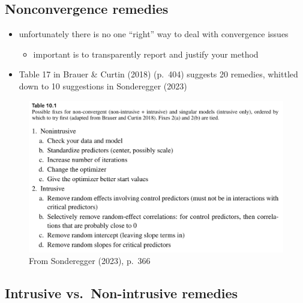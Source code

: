 \documentclass[
  letterpaper,
  DIV=11,
  numbers=noendperiod]{scrartcl}
\providecommand{\tightlist}{%
  \setlength{\itemsep}{0pt}\setlength{\parskip}{0pt}}\usepackage{longtable,booktabs,array}
\begin{document}
\hypertarget{nonconvergence-remedies}{%
\subsection{Nonconvergence remedies}\label{nonconvergence-remedies}}

\begin{itemize}
\tightlist
\item
  unfortunately there is no one ``right'' way to deal with convergence
  issues

  \begin{itemize}
  \tightlist
  \item
    important is to transparently report and justify your method
  \end{itemize}
\item
  Table 17 in Brauer \& Curtin (2018) (p.~404) suggests 20 remedies,
  whittled down to 10 suggestions in Sonderegger (2023)
\end{itemize}

\begin{figure}

{\centering \includegraphics[width=4.93in,height=\textheight]{../../media/sonderegger_2023_convergence_table10.png}

}

\caption{\label{fig-table10}From Sonderegger (2023), p.~366}

\end{figure}

\hypertarget{intrusive-vs.-non-intrusive-remedies}{%
\subsection{Intrusive vs.~Non-intrusive
remedies}\label{intrusive-vs.-non-intrusive-remedies}}
\end{document}
